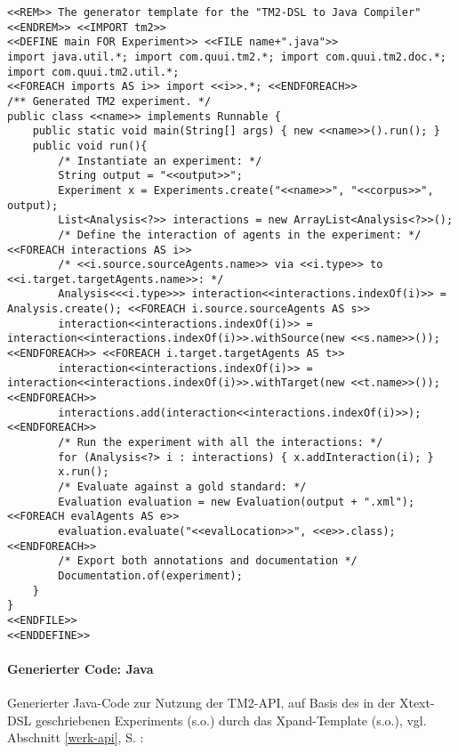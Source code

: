 \documentclass[abstracton, 12pt]{scrartcl}
\begin{document}

\begin{lstlisting}
<<REM>> The generator template for the "TM2-DSL to Java Compiler" <<ENDREM>> <<IMPORT tm2>>
<<DEFINE main FOR Experiment>> <<FILE name+".java">>
import java.util.*; import com.quui.tm2.*; import com.quui.tm2.doc.*; import com.quui.tm2.util.*;
<<FOREACH imports AS i>> import <<i>>.*; <<ENDFOREACH>>
/** Generated TM2 experiment. */
public class <<name>> implements Runnable {
    public static void main(String[] args) { new <<name>>().run(); }
    public void run(){
        /* Instantiate an experiment: */
        String output = "<<output>>";
        Experiment x = Experiments.create("<<name>>", "<<corpus>>", output);
        List<Analysis<?>> interactions = new ArrayList<Analysis<?>>();
        /* Define the interaction of agents in the experiment: */ <<FOREACH interactions AS i>> 
        /* <<i.source.sourceAgents.name>> via <<i.type>> to <<i.target.targetAgents.name>>: */
        Analysis<<<i.type>>> interaction<<interactions.indexOf(i)>> = Analysis.create(); <<FOREACH i.source.sourceAgents AS s>> 
        interaction<<interactions.indexOf(i)>> = interaction<<interactions.indexOf(i)>>.withSource(new <<s.name>>());<<ENDFOREACH>> <<FOREACH i.target.targetAgents AS t>> 
        interaction<<interactions.indexOf(i)>> = interaction<<interactions.indexOf(i)>>.withTarget(new <<t.name>>());<<ENDFOREACH>> 
        interactions.add(interaction<<interactions.indexOf(i)>>);<<ENDFOREACH>>
        /* Run the experiment with all the interactions: */
        for (Analysis<?> i : interactions) { x.addInteraction(i); }
        x.run();
        /* Evaluate against a gold standard: */
        Evaluation evaluation = new Evaluation(output + ".xml");<<FOREACH evalAgents AS e>>
        evaluation.evaluate("<<evalLocation>>", <<e>>.class);<<ENDFOREACH>>
        /* Export both annotations and documentation */
        Documentation.of(experiment);
    }
}
<<ENDFILE>>
<<ENDDEFINE>>
\end{lstlisting}

\paragraph{Generierter Code: Java}

Generierter Java-Code zur Nutzung der TM2-API, auf Basis des in der Xtext-DSL geschriebenen Experiments (s.o.) durch das Xpand-Template (s.o.), vgl. Abschnitt \ref{werk-api}, S. \pageref{werk-api}:
\end{document}

